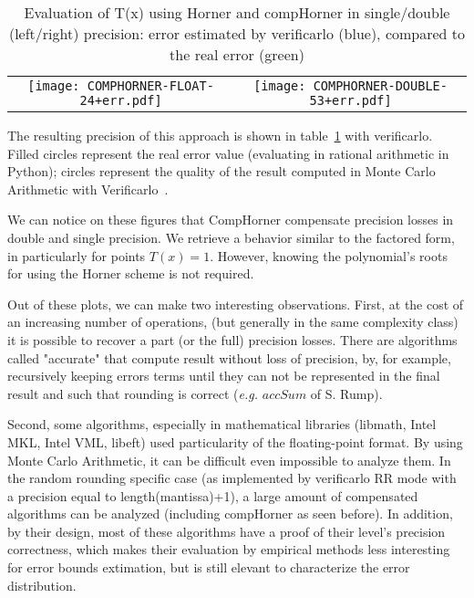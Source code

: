 \begin{table}
\begin{tabular}{cc}
\texttt{[image: COMPHORNER-FLOAT-24+err.pdf]}& 
\texttt{[image: COMPHORNER-DOUBLE-53+err.pdf]}\\
\end{tabular}
  \caption{Evaluation of T(x) using Horner and compHorner in single/double (left/right) precision: error estimated by verificarlo (blue), compared to the real error (green)}
  \label{fig:comphornerVerificarlo24_53}
\end{table}


The resulting precision of this approach is shown in table~\ref{fig:comphornerVerificarlo24_53} with verificarlo.
Filled circles represent the real error value (evaluating in rational arithmetic in Python); circles represent the quality of the result computed in Monte Carlo Arithmetic with Verificarlo~\cite{verrou}.

We can notice on these figures that CompHorner compensate precision losses in double and single precision. We retrieve a behavior similar to the factored form, in particularly for points $T(x)=1$. However, knowing the polynomial's roots for using the Horner scheme is not required.

Out of these plots, we can make two interesting observations.
First, at the cost of an increasing number of operations, (but generally in the same complexity class) it is possible to recover a part (or the full) precision losses. There are algorithms called "accurate" that compute result without loss of precision, by, for example, recursively keeping errors terms until they can not be represented in the final result and such that rounding is correct ({\it e.g.} $accSum$ of S. Rump).

Second, some algorithms, especially in mathematical libraries (libmath, Intel MKL, Intel VML, libeft) used particularity of the floating-point format. By using Monte Carlo Arithmetic, it can be difficult even impossible to analyze them. In the random rounding specific case (as implemented by verificarlo RR mode with a precision equal to length(mantissa)+1), a large amount of compensated algorithms can be analyzed (including compHorner as seen before). In addition, by their design, most of these algorithms have a proof of their level's precision correctness, which makes their evaluation by empirical methods less interesting for error bounds extimation, but is still elevant to characterize the error distribution.
